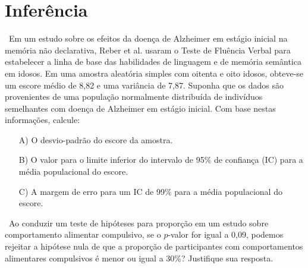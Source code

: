\documentclass[a4paper,12pt,oneside,onecolumn]{Config/milktest}
\begin{document}


\section*{Inferência}

\question \ Em um estudo sobre os efeitos da doença de Alzheimer em estágio inicial na memória não declarativa, Reber et al. usaram o Teste de Fluência Verbal para estabelecer a linha de base das habilidades de linguagem e de memória semântica em idosos. Em uma amostra aleatória simples com oitenta e oito idosos, obteve-se um escore médio de 8,82 e uma variância de 7,87. Suponha que os dados são provenientes de uma população normalmente distribuída de indivíduos semelhantes com doença de Alzheimer em estágio inicial. 
Com base nestas informações, calcule:


\begin{itemize}[leftmargin=15.5mm]
\item[A)] O desvio-padrão do escore da amostra.


\item[B)] O valor para o limite inferior do intervalo de 95$\%$ de confiança (IC) para a média populacional do escore. 

\item[C)] A margem de erro para um IC de 99$\%$ para a média populacional do escore.
\end{itemize}

\bigskip

\question \ Ao conduzir um teste de hipóteses para proporção em um estudo sobre comportamento alimentar compulsivo, se o $p$-valor for igual a 0,09, podemos rejeitar a hipótese nula de que a proporção de participantes com comportamentos alimentares compulsivos é menor ou igual a 30\%? Justifique sua resposta.
\end{document}
